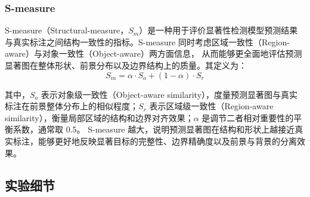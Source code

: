 \documentclass[UTF8,a4paper,10pt]{ctexart}
\begin{document}



\subsubsection{S-measure}

S-measure（Structural-measure，$S_m$）是一种用于评价显著性检测模型预测结果与真实标注之间结构一致性的指标。S-measure 同时考虑区域一致性（Region-aware）与对象一致性（Object-aware）两方面信息，
从而能够更全面地评估预测显著图在整体形状、前景分布以及边界结构上的质量。其定义为：
\begin{equation*}
  S_m = \alpha \cdot S_o + (1-\alpha) \cdot S_r
\end{equation*}

其中，$S_o$ 表示对象级一致性（Object-aware similarity），度量预测显著图与真实标注在前景整体分布上的相似程度；$S_r$ 表示区域级一致性（Region-aware similarity），衡量局部区域的结构和边界对齐效果；$\alpha$ 是调节二者相对重要性的平衡系数，通常取 0.5。
S-measure 越大，说明预测显著图在结构和形状上越接近真实标注，能够更好地反映显著目标的完整性、边界精确度以及前景与背景的分离效果。


\subsection{实验细节}
\end{document}
